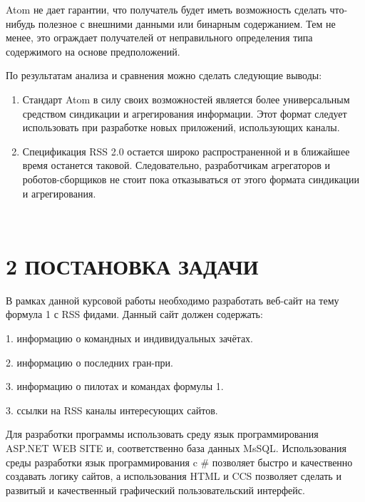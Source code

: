 \documentclass[14pt,a4paper]{extreport}
\begin{document}
 \par\noindent 
 \parindent=1cm Atom не дает гарантии, что получатель будет иметь возможность сделать что-нибудь полезное с внешними данными или бинарным содержанием. Тем не менее, это ограждает получателей от неправильного определения типа содержимого на основе предположений.\par
 По результатам анализа и сравнения можно сделать следующие выводы:
 	\begin{enumerate}
		\item Стандарт Atom в силу своих возможностей является более универсальным средством синдикации и агрегирования информации. Этот формат следует использовать при разработке новых приложений, использующих каналы.	
		\item Спецификация RSS 2.0 остается широко распространенной и в ближайшее время останется таковой. Следовательно, разработчикам агрегаторов и роботов-сборщиков не стоит пока отказываться от этого формата синдикации и агрегирования.
	\end{enumerate}	
 \par\noindent 
           
\
	
            
         
	\newpage
	\section*{\normalsize\hspace{2ex}2 ПОСТАНОВКА ЗАДАЧИ}

В рамках данной курсовой работы необходимо разработать веб-сайт на тему формула 1 с RSS фидами. Данный сайт должен содержать:

\hspace {4ex}1.	информацию о командных и индивидуальных зачётах.\

\hspace{4ex}2.	информацию о последних гран-при.\

\hspace{4ex}3.	информацию о пилотах и командах формулы 1.\

\hspace{4ex}3.	ссылки на RSS каналы интересующих сайтов.\

Для разработки программы использовать среду язык программирования ASP.NET WEB SITE  и, соответственно база данных MsSQL. Использования среды разработки язык программирования c \#  позволяет быстро и качественно создавать логику сайтов, а использования  HTML и CCS позволяет сделать и развитый и качественный графический пользовательский интерфейс.
\
\end{document}
